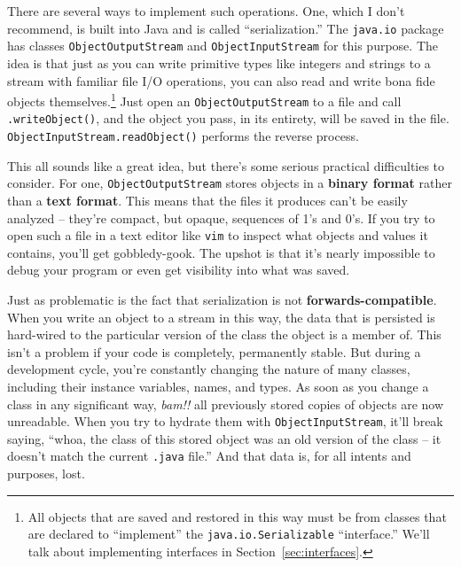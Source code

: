 There are several ways to implement such operations. One, which I don't
recommend, is built into Java and is called ``serialization.'' The
\texttt{java.io} package has classes \texttt{ObjectOutputStream} and
\texttt{ObjectInputStream} for this purpose. The idea is that just as you can
write primitive types like integers and strings to a stream with familiar file
I/O operations, you can also read and write bona fide objects
themselves.\footnote{All objects that are saved and restored in this way must
be from classes that are declared to ``implement'' the
\texttt{java.io.Serializable} ``interface.'' We'll talk about implementing
interfaces in Section~\ref{sec:interfaces}.} Just open an
\texttt{ObjectOutputStream} to a file and call \texttt{.writeObject()}, and
the object you pass, in its entirety, will be saved in the file.
\texttt{ObjectInputStream.readObject()} performs the reverse process.

This all sounds like a great idea, but there's some serious practical
difficulties to consider. For one, \texttt{ObjectOutputStream} stores objects
in a \textbf{binary format} rather than a \textbf{text format}. This means
that the files it produces can't be easily analyzed -- they're compact, but
opaque, sequences of 1's and 0's. If you try to open such a file in a text
editor like \texttt{vim} to inspect what objects and values it contains,
you'll get gobbledy-gook. The upshot is that it's nearly impossible to debug
your program or even get visibility into what was saved.

Just as problematic is the fact that serialization is not
\textbf{forwards-compatible}. When you write an object to a stream in this
way, the data that is persisted is hard-wired to the particular version of the
class the object is a member of. This isn't a problem if your code is
completely, permanently stable. But during a development cycle, you're
constantly changing the nature of many classes, including their instance
variables, names, and types. As soon as you change a class in any significant
way, \textit{bam!!} all previously stored copies of objects are now
unreadable. When you try to hydrate them with \texttt{ObjectInputStream},
it'll break saying, ``whoa, the class of this stored object was an old version
of the class -- it doesn't match the current \texttt{.java} file.'' And that
data is, for all intents and purposes, lost.

